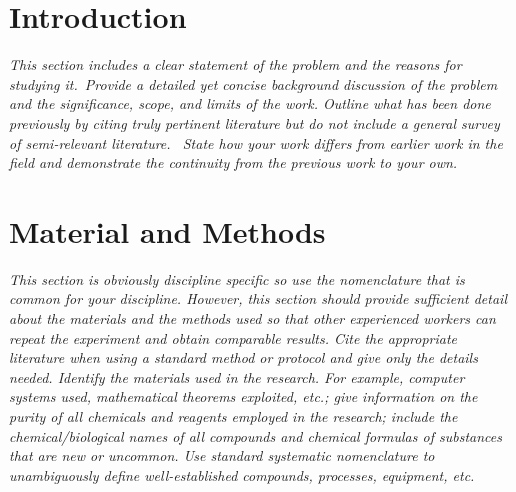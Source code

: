 \documentclass[11pt,a4paper,oneside]{report}
\newcommand{\instructions}[1]{{\color{black}\itshape #1}}
\begin{document}

\setcounter{tocdepth}{1}
\listoftables\newpage


\clearpage
{}


\chapter{Introduction}
\label{introduction}

\instructions{This section includes a clear statement of the problem and the
reasons for studying it.~Provide a detailed yet concise background
discussion of the problem and the significance, scope, and limits of the
work. Outline what has been done previously by citing truly pertinent
literature but do not include a general survey of semi-relevant
literature.~ State how your work differs from earlier work in the field
and demonstrate the continuity from the previous work to your own.}


\chapter{Material and Methods}
\label{material-and-methods}

\instructions{This section is obviously discipline specific so use the
nomenclature that is common for your discipline. However, this section
should provide sufficient detail about the materials and the methods
used so that other experienced workers can repeat the experiment and
obtain comparable results. Cite the appropriate literature when using a
standard method or protocol and give only the details needed. Identify
the materials used in the research. For example, computer systems used,
mathematical theorems exploited, etc.; give information on the purity of
all chemicals and reagents employed in the research; include the
chemical/biological names of all compounds and chemical formulas of
substances that are new or uncommon. Use standard systematic
nomenclature to unambiguously define well-established compounds,
processes, equipment, etc.}
\end{document}
